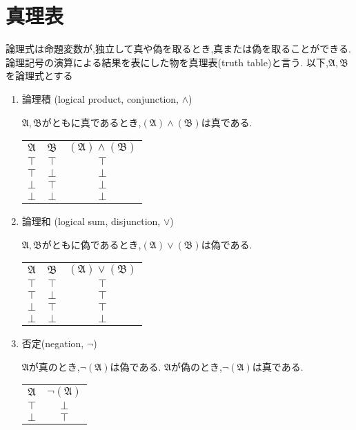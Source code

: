 \section{真理表}
論理式は命題変数が,独立して真や偽を取るとき,真または偽を取ることができる.
論理記号の演算による結果を表にした物を真理表(truth table)と言う.
以下,$\mathfrak{A},\mathfrak{B}$を論理式とする
\begin{enumerate}
 \item 論理積 (logical product, conjunction, $\land$)

   $\mathfrak{A},\mathfrak{B}$がともに真であるとき,$(\mathfrak{A}) \land (\mathfrak{B})$は真である.

	   \begin{tabular}{|c c||c|}
		\hline
		$\mathfrak{A}$    & $\mathfrak{B}$    & $(\mathfrak{A}) \land (\mathfrak{B})$ \\
		\hhline{|==#=|}
		$\top$ & $\top$ & $\top$ \\
		\hline
		$\top$ & $\bot$ & $\bot$ \\
		\hline
		$\bot$ & $\top$ & $\bot$ \\
		\hline
		$\bot$ & $\bot$ & $\bot$ \\
		\hline
	   \end{tabular}

 \item 論理和 (logical sum, disjunction, $\lor$)

	   $\mathfrak{A},\mathfrak{B}$がともに偽であるとき,$(\mathfrak{A}) \lor (\mathfrak{B})$は偽である.

	   \begin{tabular}{|c c||c|}
		\hline
		$\mathfrak{A}$    & $\mathfrak{B}$    & $(\mathfrak{A}) \lor (\mathfrak{B})$ \\
		\hhline{|==#=|}
		$\top$ & $\top$ & $\top$ \\
		\hline
		$\top$ & $\bot$ & $\top$ \\
		\hline
		$\bot$ & $\top$ & $\top$ \\
		\hline
		$\bot$ & $\bot$ & $\bot$ \\
		\hline
	   \end{tabular}
 \item 否定(negation, $\lnot$)

	   $\mathfrak{A}$が真のとき,$\lnot (\mathfrak{A})$は偽である.
	   $\mathfrak{A}$が偽のとき,$\lnot (\mathfrak{A})$は真である.


	   \begin{tabular}{|c||c|}
		\hline
		$\mathfrak{A}$    & $\lnot (\mathfrak{A}) $ \\
		\hhline{|=#=|}
		$\top$ & $\bot$ \\
		\hline
		$\bot$ & $\top$ \\
		\hline
	   \end{tabular}
\end{enumerate}